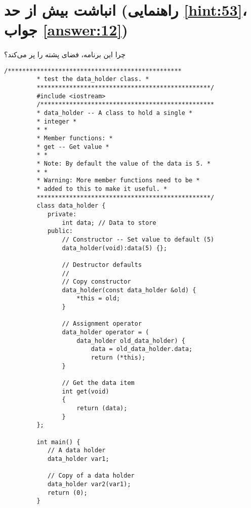 \section[انباشت بیش از حد]{انباشت بیش از حد \protect{} (راهنمایی \ref{hint:53}، جواب \ref{answer:12})}
\paragraph{}\label{prog:36}
چرا این برنامه، فضای پشته را پر می‌کند؟

\begin{LTR}
    \begin{lstlisting}[style=C++Style]
         /************************************************
         * test the data_holder class. *
         ************************************************/
         #include <iostream>
         /************************************************
         * data_holder -- A class to hold a single *
         * integer *
         * *
         * Member functions: *
         * get -- Get value *
         * *
         * Note: By default the value of the data is 5. *
         * *
         * Warning: More member functions need to be *
         * added to this to make it useful. *
         ************************************************/
         class data_holder {
         	private:
         		int data; // Data to store
         	public:
         		// Constructor -- Set value to default (5)
         		data_holder(void):data(5) {};

         		// Destructor defaults
         		//
         		// Copy constructor
         		data_holder(const data_holder &old) {
         			*this = old;
         		}

         		// Assignment operator
         		data_holder operator = (
         			data_holder old_data_holder) {
         				data = old_data_holder.data;
         				return (*this);
         		}

         		// Get the data item
         		int get(void)
         		{
         			return (data);
         		}
         };

         int main() {
         	// A data holder
         	data_holder var1;

         	// Copy of a data holder
         	data_holder var2(var1);
         	return (0);
         }
    \end{lstlisting}
\end{LTR}